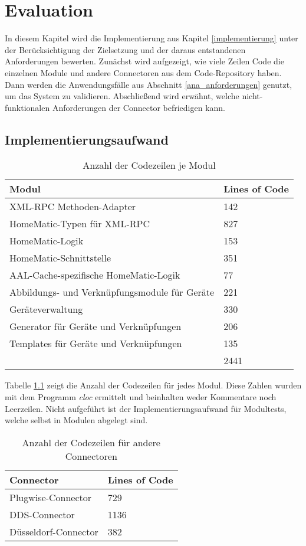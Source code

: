 \chapter{Evaluation}
\label{bewertung}

In diesem Kapitel wird die Implementierung aus Kapitel \ref{implementierung} unter der
Berücksichtigung der Zielsetzung und der daraus entstandenen Anforderungen bewerten.
Zunächst wird aufgezeigt, wie viele Zeilen Code die einzelnen Module und andere Connectoren
aus dem Code-Repository \cite{aalcache_code} haben.
Dann werden die Anwendungsfälle aus Abschnitt \ref{ana_anforderungen} genutzt, um das
System zu validieren.
Abschließend wird erwähnt, welche nicht-funktionalen Anforderungen der Connector befriedigen
kann.

\section{Implementierungsaufwand}

\begin{table}[h]
\begin{tabular}{|l|l|}
\hline
Modul & Lines of Code\\
\hline
XML-RPC Methoden-Adapter & 142\\
HomeMatic-Typen für XML-RPC & 827\\
HomeMatic-Logik & 153\\
HomeMatic-Schnittstelle & 351\\
AAL-Cache-spezifische HomeMatic-Logik & 77\\
Abbildungs- und Verknüpfungsmodule für Geräte & 221\\
Geräteverwaltung & 330\\
Generator für Geräte und Verknüpfungen & 206\\
Templates für Geräte und Verknüpfungen & 135\\
\hline
& 2441\\
\hline
\end{tabular}
\caption{Anzahl der Codezeilen je Modul}
\label{tab_implauf}
\end{table}

Tabelle \ref{tab_implauf} zeigt die Anzahl der Codezeilen für jedes Modul.
Diese Zahlen wurden mit dem Programm \emph{cloc} \cite{cloc} ermittelt und beinhalten
weder Kommentare noch Leerzeilen.
Nicht aufgeführt ist der Implementierungsaufwand für Modultests, welche selbst in Modulen abgelegt sind.

\begin{table}[h]
\begin{tabular}{|l|l|}
\hline
Connector & Lines of Code\\
\hline
Plugwise-Connector & 729\\
DDS-Connector \cite{ddsconn} & 1136\\
Düsseldorf-Connector \cite{dconn} & 382\\
\hline
\end{tabular}
\caption{Anzahl der Codezeilen für andere Connectoren}
\label{tab_conns}
\end{table}

